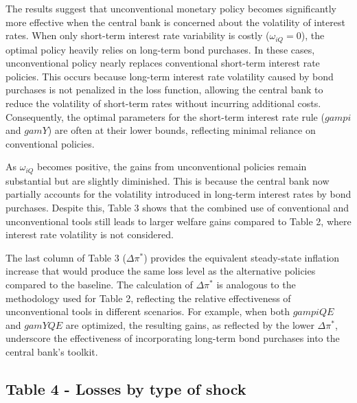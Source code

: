 \documentclass[12pt]{article}
\begin{document}
The results suggest that unconventional monetary policy becomes significantly more effective when the central bank is concerned about the volatility of interest rates. When only short-term interest rate variability is costly (\(\omega_{iQ} = 0\)), the optimal policy heavily relies on long-term bond purchases. In these cases, unconventional policy nearly replaces conventional short-term interest rate policies. This occurs because long-term interest rate volatility caused by bond purchases is not penalized in the loss function, allowing the central bank to reduce the volatility of short-term rates without incurring additional costs. Consequently, the optimal parameters for the short-term interest rate rule (\(gampi\) and \(gamY\)) are often at their lower bounds, reflecting minimal reliance on conventional policies.

As \(\omega_{iQ}\) becomes positive, the gains from unconventional policies remain substantial but are slightly diminished. This is because the central bank now partially accounts for the volatility introduced in long-term interest rates by bond purchases. Despite this, Table 3 shows that the combined use of conventional and unconventional tools still leads to larger welfare gains compared to Table 2, where interest rate volatility is not considered. 

The last column of Table 3 (\(\Delta \pi^*\)) provides the equivalent steady-state inflation increase that would produce the same loss level as the alternative policies compared to the baseline. The calculation of \(\Delta \pi^*\) is analogous to the methodology used for Table 2, reflecting the relative effectiveness of unconventional tools in different scenarios. For example, when both \(gampiQE\) and \(gamYQE\) are optimized, the resulting gains, as reflected by the lower \(\Delta \pi^*\), underscore the effectiveness of incorporating long-term bond purchases into the central bank's toolkit.











\subsection*{Table 4 - Losses by type of shock}
\end{document}
